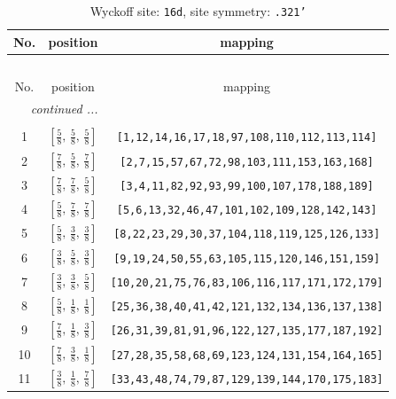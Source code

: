 \documentclass[fleqn,8pt]{jsarticle}
\begin{document}
\begin{longtable}{ccc}
\caption{Wyckoff site: {\tt 16d}, site symmetry: {\tt .321'}}
 \\
 \hline \hline
No. & position & mapping \\ \hline \endfirsthead

\multicolumn{2}{l}{\tablename\ \thetable{}} \\
 \hline \hline
No. & position & mapping \\ \hline \endhead

 \hline \hline
\multicolumn{2}{r}{\footnotesize\it continued ...} \\ \endfoot

 \hline \hline
\multicolumn{2}{r}{} \\ \endlastfoot

1 & $\left[ \frac{5}{8},\, \frac{5}{8},\, \frac{5}{8} \right]$ & {\tt [1,12,14,16,17,18,97,108,110,112,113,114]} \\ \hline
2 & $\left[ \frac{7}{8},\, \frac{5}{8},\, \frac{7}{8} \right]$ & {\tt [2,7,15,57,67,72,98,103,111,153,163,168]} \\ \hline
3 & $\left[ \frac{7}{8},\, \frac{7}{8},\, \frac{5}{8} \right]$ & {\tt [3,4,11,82,92,93,99,100,107,178,188,189]} \\ \hline
4 & $\left[ \frac{5}{8},\, \frac{7}{8},\, \frac{7}{8} \right]$ & {\tt [5,6,13,32,46,47,101,102,109,128,142,143]} \\ \hline
5 & $\left[ \frac{5}{8},\, \frac{3}{8},\, \frac{3}{8} \right]$ & {\tt [8,22,23,29,30,37,104,118,119,125,126,133]} \\ \hline
6 & $\left[ \frac{3}{8},\, \frac{5}{8},\, \frac{3}{8} \right]$ & {\tt [9,19,24,50,55,63,105,115,120,146,151,159]} \\ \hline
7 & $\left[ \frac{3}{8},\, \frac{3}{8},\, \frac{5}{8} \right]$ & {\tt [10,20,21,75,76,83,106,116,117,171,172,179]} \\ \hline
8 & $\left[ \frac{5}{8},\, \frac{1}{8},\, \frac{1}{8} \right]$ & {\tt [25,36,38,40,41,42,121,132,134,136,137,138]} \\ \hline
9 & $\left[ \frac{7}{8},\, \frac{1}{8},\, \frac{3}{8} \right]$ & {\tt [26,31,39,81,91,96,122,127,135,177,187,192]} \\ \hline
10 & $\left[ \frac{7}{8},\, \frac{3}{8},\, \frac{1}{8} \right]$ & {\tt [27,28,35,58,68,69,123,124,131,154,164,165]} \\ \hline
11 & $\left[ \frac{3}{8},\, \frac{1}{8},\, \frac{7}{8} \right]$ & {\tt [33,43,48,74,79,87,129,139,144,170,175,183]} \\ \hline

\end{longtable}
\end{document}
